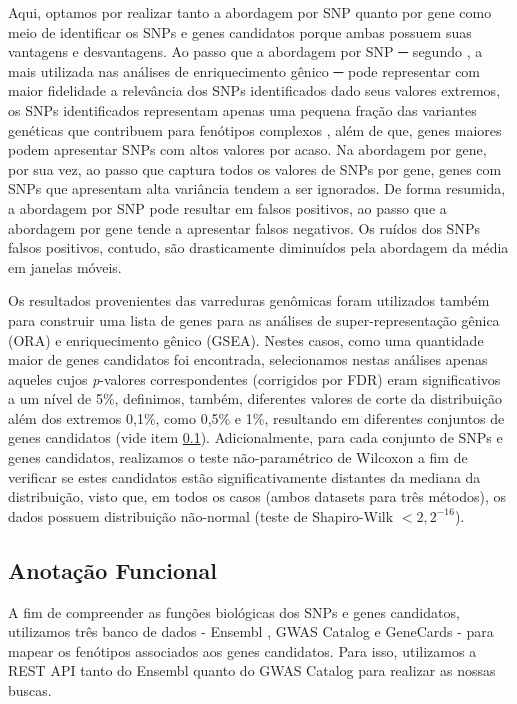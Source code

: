 Aqui, optamos por realizar tanto a abordagem por SNP quanto por gene como meio de identificar os SNPs e genes candidatos porque ambas possuem suas vantagens e desvantagens. Ao passo que a abordagem por SNP ─ segundo \cite{weng_snp-based_2011}, a mais utilizada nas análises de enriquecimento gênico ─ pode representar com maior fidelidade a relevância dos SNPs identificados dado seus valores extremos, os SNPs identificados representam apenas uma pequena fração das variantes genéticas que contribuem para fenótipos complexos \cite{shriner_problems_2007}, além de que, genes maiores podem apresentar SNPs com altos valores por acaso. Na abordagem por gene, por sua vez, ao passo que captura todos os valores de SNPs por gene, genes com SNPs que apresentam alta variância tendem a ser ignorados. De forma resumida, a abordagem por SNP pode resultar em falsos positivos, ao passo que a abordagem por gene tende a apresentar falsos negativos. Os ruídos dos SNPs falsos positivos, contudo, são drasticamente diminuídos pela abordagem da média em janelas móveis.

Os resultados provenientes das varreduras genômicas foram utilizados também para construir uma lista de genes para as análises de super-representação gênica (ORA) e enriquecimento gênico (GSEA). Nestes casos, como uma quantidade maior de genes candidatos foi encontrada, selecionamos nestas análises apenas aqueles cujos \emph{p}-valores correspondentes (corrigidos por FDR) eram significativos a um nível de 5\%, definimos, também, diferentes valores de corte da distribuição além dos extremos 0,1\%, como 0,5\% e 1\%, resultando em diferentes conjuntos de genes candidatos (vide item \ref{subsec:amazonia_methods_annotfuncional}). Adicionalmente, para cada conjunto de SNPs e genes candidatos, realizamos o teste não-paramétrico de Wilcoxon \cite{wilcoxon_individual_1945} a fim de verificar se estes candidatos estão significativamente distantes da mediana da distribuição, visto que, em todos os casos (ambos datasets para três métodos), os dados possuem distribuição não-normal (teste de Shapiro-Wilk $< 2,2^{-16}$).

\subsection{Anotação Funcional}
\label{subsec:amazonia_methods_annotfuncional}

A fim de compreender as funções biológicas dos SNPs e genes candidatos, utilizamos três banco de dados - Ensembl \cite{yates_ensembl_2015}, GWAS Catalog \cite{buniello_nhgri-ebi_2019,macarthur_new_2017} e GeneCards \cite{stelzer_genecards_2016} - para mapear os fenótipos associados aos genes candidatos. Para isso, utilizamos a REST API tanto do Ensembl quanto do GWAS Catalog para realizar as nossas buscas.

